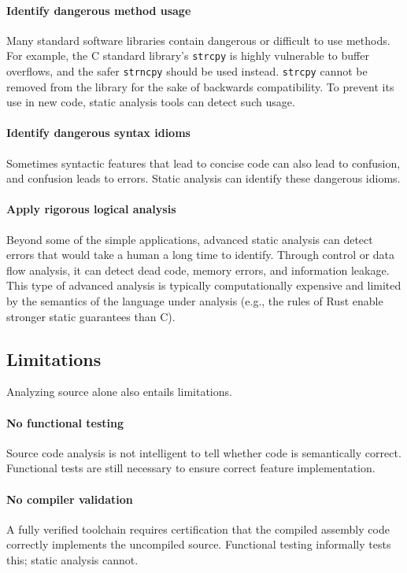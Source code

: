 \documentclass[journal]{IEEEtran}
\def\tt#1{\mbox{\texttt{#1}}}
\begin{document}
\paragraph{Identify dangerous method usage} Many standard software libraries contain dangerous or
difficult to use methods. For example, the C standard library's \tt{strcpy} is highly vulnerable to
buffer overflows, and the safer \tt{strncpy} should be used instead. \tt{strcpy} cannot be removed
from the library for the sake of backwards compatibility. To prevent its use in new code, static
analysis tools can detect such usage.

\paragraph{Identify dangerous syntax idioms} Sometimes syntactic features that lead to concise code
can also lead to confusion, and confusion leads to errors. Static analysis can identify these
dangerous idioms.

\paragraph{Apply rigorous logical analysis} Beyond some of the simple applications, advanced static
analysis can detect errors that would take a human a long time to identify. Through control or data
flow analysis, it can detect dead code, memory errors, and information leakage. This type of
advanced analysis is typically computationally expensive and limited by the semantics of the
language under analysis (e.g., the rules of Rust enable stronger static guarantees than C).

\subsection{Limitations}

Analyzing source alone also entails limitations.

\paragraph{No functional testing} Source code analysis is not intelligent to tell whether code is
semantically correct. Functional tests are still necessary to ensure correct feature implementation.

\paragraph{No compiler validation} A fully verified toolchain requires certification that the
compiled assembly code correctly implements the uncompiled source. Functional testing informally
tests this; static analysis cannot.
\end{document}
